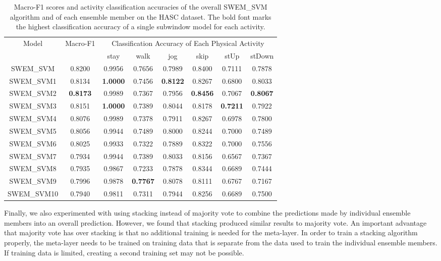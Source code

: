 \documentclass[letterpaper]{article}
\begin{document}
\begin{table*}[!htbp]
\small
\centering
\begin{tabular}{|c|c|c|c|c|c|c|c|}  \hline
\multicolumn{1}{|c|}{\multirow{2}{*}{Model}} & 
\multicolumn{1}{|c|}{\multirow{2}{*}{Macro-F1}} & 
\multicolumn{6}{|c|}{Classification Accuracy of Each Physical Activity} \\ \cline{3-8}
             &    & stay       & walk       & jog        & skip       & stUp       & stDown \\ \hline
SWEM\_SVM & 0.8200 & 0.9956     & 0.7656     & 0.7989     & 0.8400    & 0.7111     & 0.7878 \\ \hline 
SWEM\_SVM1 & 0.8134 & \bf 1.0000 & 0.7456     & \bf 0.8122 & 0.8267     & 0.6800     & 0.8033 \\ 
SWEM\_SVM2 & {\bf 0.8173} & 0.9989     & 0.7367     & 0.7956     & \bf 0.8456 & 0.7067     & \bf 0.8067 \\ 
SWEM\_SVM3 & 0.8151 & \bf 1.0000 & 0.7389     & 0.8044     & 0.8178     & \bf 0.7211 & 0.7922 \\ 
SWEM\_SVM4 & 0.8076 & 0.9989     & 0.7378     & 0.7911     & 0.8267     & 0.6978     & 0.7800 \\ 
SWEM\_SVM5 & 0.8056 & 0.9944     & 0.7489     & 0.8000     & 0.8244     & 0.7000     & 0.7489 \\ 
SWEM\_SVM6 & 0.8025 & 0.9933     & 0.7322     & 0.7889     & 0.8322     & 0.7000     & 0.7556 \\ 
SWEM\_SVM7 & 0.7934 & 0.9944     & 0.7389     & 0.8033     & 0.8156     & 0.6567     & 0.7367 \\ 
SWEM\_SVM8 & 0.7935 & 0.9867     & 0.7233     & 0.7878     & 0.8344     & 0.6689     & 0.7444 \\ 
SWEM\_SVM9 & 0.7996 & 0.9878     & \bf 0.7767 & 0.8078     & 0.8111     & 0.6767     & 0.7167 \\ 
SWEM\_SVM10 & 0.7940 & 0.9811    & 0.7311     & 0.7944     & 0.8256     & 0.6689     & 0.7500 \\ \hline
\end{tabular}
\caption{Macro-F1 scores and activity classification accuracies of the overall SWEM\_SVM algorithm and of each ensemble member on the HASC dataset. The bold font marks the highest classification accuracy of a single subwindow model for each activity.}
\label{tbl:actacc_hasc_svm}
\end{table*}

Finally, we also experimented with using stacking \cite{Wolpert:92} instead of majority vote to combine the predictions made by individual ensemble members into an overall prediction. However, we found that stacking produced similar results to majority vote. An important advantage that majority vote has over stacking is that no additional training is needed for the meta-layer. In order to train a stacking algorithm properly, the meta-layer needs to be trained on training data that is separate from the data used to train the individual ensemble members. If training data is limited, creating a second training set may not be possible.
\end{document}
